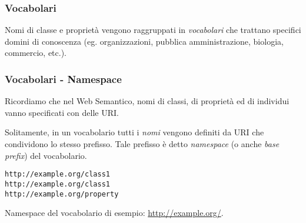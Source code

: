 \documentclass[8pt]{beamer}
\begin{document}
\begin{frame}
\frametitle{Vocabolari}

Nomi di classe e propriet\`a vengono raggruppati in \emph{vocabolari}
che trattano specifici domini di conoscenza (eg. organizzazioni, 
pubblica amministrazione, biologia, commercio, etc.). 
\vspace{\baselineskip}



\end{frame}

\begin{frame}[fragile]
\frametitle{Vocabolari - Namespace}

Ricordiamo che nel Web Semantico, nomi di classi, di propriet\`a ed di individui
vanno specificati con delle URI.
\vspace{\baselineskip}

Solitamente, in un vocabolario tutti i \emph{nomi} vengono definiti da URI che
condividono lo stesso prefisso. Tale prefisso \`e
detto \emph{namespace} (o anche \emph{base prefix}) del vocabolario.
\vspace{\baselineskip}

\phantom{
Tale namespace pu\`o essere anche omesso.
}

\begin{verbatim}
http://example.org/class1 
http://example.org/class1 
http://example.org/property 
\end{verbatim}
 
Namespace del vocabolario di esempio: \url{http://example.org/}.

\end{frame}
\end{document}
